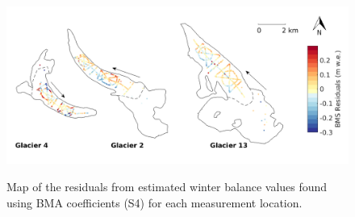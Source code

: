 \documentclass{sfuthesis}
\begin{document}
{\begin{figure}[H]
	\centering
	\includegraphics[width =\textwidth]{residualsMap_BMS.png}\\
	\caption{Map of the residuals from estimated winter balance values found using BMA coefficients (S4) for each measurement location.}
	\label{fig:BMS_residualsMap}
\end{figure} 


}
\end{document}
